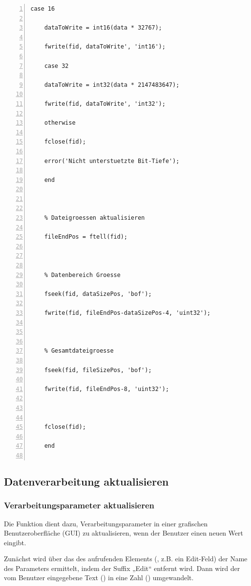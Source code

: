 \begin{lstlisting}[frame=single, numbers=left, style=Matlab-Pyglike]
    case 16 
    
    dataToWrite = int16(data * 32767); 
    
    fwrite(fid, dataToWrite', 'int16'); 
    
    case 32 
    
    dataToWrite = int32(data * 2147483647); 
    
    fwrite(fid, dataToWrite', 'int32'); 
    
    otherwise 
    
    fclose(fid); 
    
    error('Nicht unterstuetzte Bit-Tiefe'); 
    
    end 
    
    
    
    % Dateigroessen aktualisieren 
    
    fileEndPos = ftell(fid); 
    
    
    
    % Datenbereich Groesse 
    
    fseek(fid, dataSizePos, 'bof'); 
    
    fwrite(fid, fileEndPos-dataSizePos-4, 'uint32'); 
    
    
    
    % Gesamtdateigroesse 
    
    fseek(fid, fileSizePos, 'bof'); 
    
    fwrite(fid, fileEndPos-8, 'uint32'); 
    
    
    
    fclose(fid); 
    
    end 	
    
\end{lstlisting}


\subsection{Datenverarbeitung aktualisieren}

\subsubsection{Verarbeitungsparameter aktualisieren}

Die Funktion  dient dazu, Verarbeitungsparameter in einer grafischen Benutzeroberfläche (GUI) zu aktualisieren, wenn der Benutzer einen neuen Wert eingibt. 

Zunächst wird über das  des aufrufenden Elements (, z.B. ein Edit-Feld) der Name des Parameters ermittelt, indem der Suffix „Edit“ entfernt wird. Dann wird der vom Benutzer eingegebene Text () in eine Zahl () umgewandelt. 

